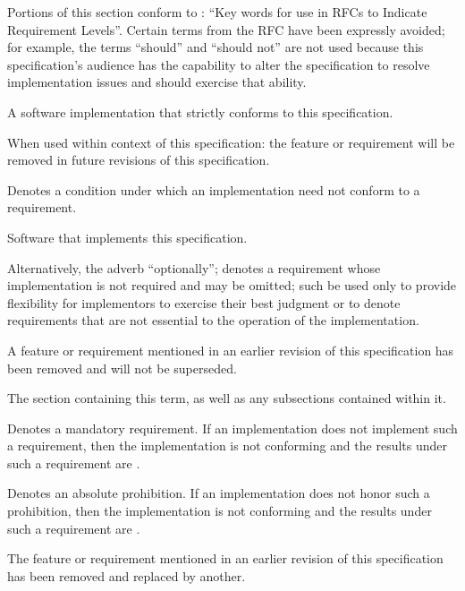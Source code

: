 %


Portions of this section conform to : ``Key words for use in RFCs to
Indicate Requirement Levels''. Certain terms from the RFC have been expressly
avoided; for example, the terms ``should'' and ``should not'' are not used
because this specification's audience has the capability to alter the
specification to resolve implementation issues and should exercise that ability.

\begin{description}
  A software implementation that strictly conforms to this specification.

  When used within context of this specification: the feature or requirement
  will be removed in future revisions of this specification.

  Denotes a condition under which an implementation need not conform to a
  requirement.

  Software that implements this specification.

  Alternatively, the adverb ``optionally''; denotes a requirement whose
  implementation is not required and may be omitted; such \shall be used only to
  provide flexibility for implementors to exercise their best judgment or to
  denote requirements that are not essential to the operation of the
  implementation.

  A feature or requirement mentioned in an earlier revision of this
  specification has been removed and will not be superseded.

  The section containing this term, as well as any subsections contained within
  it.

  Denotes a mandatory requirement. If an implementation does not implement such
  a requirement, then the implementation is not conforming and the results under
  such a requirement are \undefined.

  Denotes an absolute prohibition. If an implementation does not honor such a
  prohibition, then the implementation is not conforming and the results under
  such a requirement are \undefined.

  The feature or requirement mentioned in an earlier revision of this
  specification has been removed and replaced by another.


\end{description}
